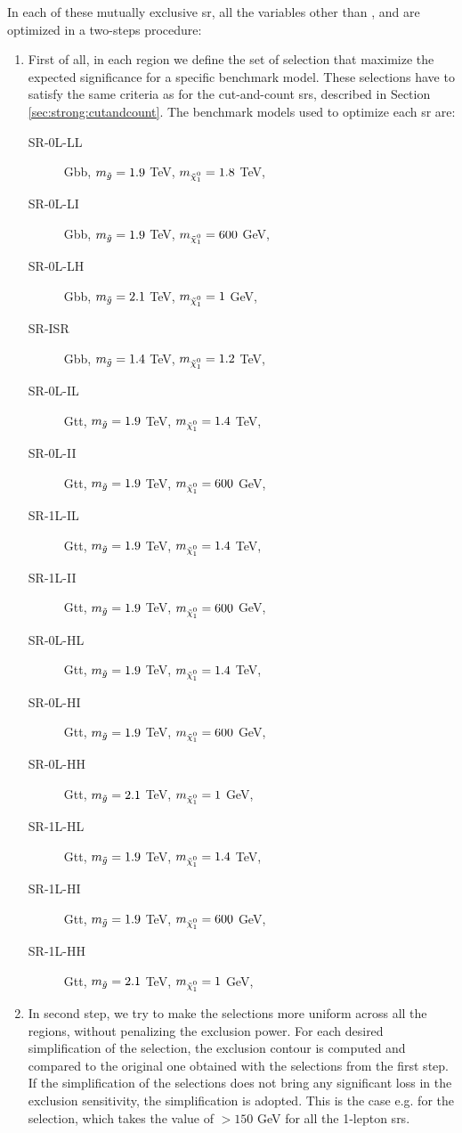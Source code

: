 In each of these mutually exclusive \gls{sr}, all the variables other than \njet, \nlep and \meff are optimized in a two-steps procedure:
\begin{enumerate}
\item First of all, in each region we define the set of selection that maximize the expected significance for a specific benchmark model. 
These selections have to satisfy the same criteria as for the cut-and-count \glspl{sr}, described in Section \ref{sec:strong:cutandcount}.
The benchmark models used to optimize each \gls{sr} are:
\begin{description}
\item[SR-0L-LL] Gbb, $m_{\tilde{g}} = 1.9$ TeV, $m_{\ninoone} = 1.8$ TeV,
\item[SR-0L-LI] Gbb, $m_{\tilde{g}} = 1.9$ TeV, $m_{\ninoone} = 600$ GeV,
\item[SR-0L-LH] Gbb, $m_{\tilde{g}} = 2.1$ TeV, $m_{\ninoone} = 1$ GeV,
\item[SR-ISR]   Gbb, $m_{\tilde{g}} = 1.4$ TeV, $m_{\ninoone} = 1.2$ TeV,

\item[SR-0L-IL] Gtt, $m_{\tilde{g}} = 1.9$ TeV, $m_{\ninoone} = 1.4$ TeV,
\item[SR-0L-II] Gtt, $m_{\tilde{g}} = 1.9$ TeV, $m_{\ninoone} = 600$ GeV,

\item[SR-1L-IL] Gtt, $m_{\tilde{g}} = 1.9$ TeV, $m_{\ninoone} = 1.4$ TeV,
\item[SR-1L-II] Gtt, $m_{\tilde{g}} = 1.9$ TeV, $m_{\ninoone} = 600$ GeV,

\item[SR-0L-HL] Gtt, $m_{\tilde{g}} = 1.9$ TeV, $m_{\ninoone} = 1.4$ TeV,
\item[SR-0L-HI] Gtt, $m_{\tilde{g}} = 1.9$ TeV, $m_{\ninoone} = 600$ GeV,
\item[SR-0L-HH] Gtt, $m_{\tilde{g}} = 2.1$ TeV, $m_{\ninoone} = 1$ GeV,

\item[SR-1L-HL] Gtt, $m_{\tilde{g}} = 1.9$ TeV, $m_{\ninoone} = 1.4$ TeV,
\item[SR-1L-HI] Gtt, $m_{\tilde{g}} = 1.9$ TeV, $m_{\ninoone} = 600$ GeV,
\item[SR-1L-HH] Gtt, $m_{\tilde{g}} = 2.1$ TeV, $m_{\ninoone} = 1$ GeV,

\end{description}


\item In  second step, we try to make the selections more uniform across all the regions, without penalizing the exclusion power. 
For each desired simplification of the selection, the exclusion contour is computed and compared to the original one obtained with the selections from the first step. If the simplification of the selections does not bring any significant loss in the exclusion sensitivity, the simplification is adopted. This is the case e.g. for the \mt selection, which takes the value of $>150$ GeV for all the 1-lepton \glspl{sr}.
\end{enumerate}



